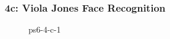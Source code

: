 \documentclass[../report.tex]{subfiles}
\begin{document}
    \begin{frame}
        \frametitle{4c: Viola Jones Face Recognition}
        \begin{figure}[!htb]
            \centering
            \caption{ps6-4-c-1}
        \end{figure}
    \end{frame}
    
\end{document}
